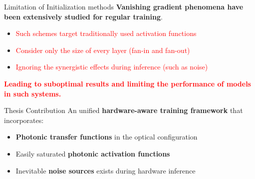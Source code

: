 \begin{frame}{Limitation of Initialization methods} %
    \textbf{Vanishing gradient phenomena have been extensively studied for regular training}.
    \begin{itemize}
        \item \textcolor{red}{Such schemes target traditionally used activation functions}
        \item \textcolor{red}{Consider only the size of every layer (fan-in and fan-out)}
        \item \textcolor{red}{Ignoring the synergistic effects during inference (such as noise)}
    \end{itemize}
    \textcolor{red}{\textbf{Leading to suboptimal results and limiting the performance of models in such systems.}}
  \end{frame}


\begin{frame}{Thesis Contribution}
  An unified \textbf{hardware-aware training framework} that incorporates: 
  \begin{itemize}
    \item \textbf{Photonic transfer functions} in the optical configuration
    \item Easily saturated \textbf{photonic activation functions}
    \item Inevitable \textbf{noise sources} exists during hardware inference
    \end{itemize}
    

\end{frame}



